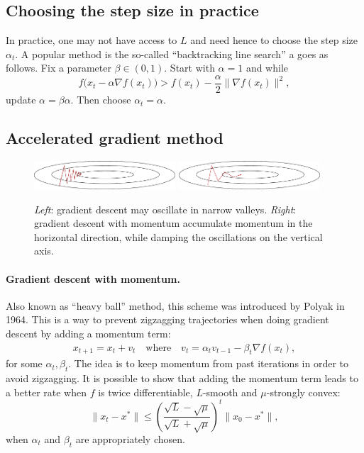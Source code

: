 \documentclass[11pt,nocut]{article}
\begin{document}
\subsection{Choosing the step size in practice}

In practice, one may not have access to $L$ and need hence to choose the step size $\alpha_t$. A popular method is the so-called ``backtracking line search'' a goes as follows.
Fix a parameter $\beta \in (0,1)$.
Start with $\alpha = 1$ and while
$$
f\big(x_t - \alpha \nabla f (x_t) \big) > f(x_t) - \frac{\alpha}{2} \|\nabla f(x_t) \|^2,
$$
update $\alpha =\beta \alpha$. Then choose $\alpha_t = \alpha$.

\subsection{Accelerated gradient method}

\begin{figure}[H]
	\begin{center}
		\includegraphics[width=0.47\textwidth]{figures/gd.pdf}
		\hspace{7mm}
		\includegraphics[width=0.47\textwidth]{figures/momentum.pdf}
		\caption{\emph{Left}: gradient descent may oscillate in narrow valleys. \emph{Right}: gradient descent with momentum accumulate momentum in the horizontal direction, while damping the oscillations on the vertical axis.}
	\end{center}
\end{figure}
\paragraph{Gradient descent with momentum.}

Also known as ``heavy ball'' method, this scheme was introduced by Polyak in 1964.
This is a way to prevent zigzagging trajectories when doing gradient descent by adding a momentum term:
\begin{align*}
	x_{t+1} = x_t + v_t
	\quad \text{where} \quad
	v_t = \alpha_t v_{t-1} - \beta_t \nabla f(x_{t}),
\end{align*}
for some $\alpha_t,\beta_t$. The idea is to keep momentum from past iterations in order to avoid zigzagging. It is possible to show that adding the momentum term leads to a better rate when $f$ is twice differentiable, $L$-smooth and $\mu$-strongly convex:
$$
\|x_t - x^*\| \leq \left(\frac{\sqrt{L}-\sqrt{\mu}}{\sqrt{L} + \sqrt{\mu}}\right)^{\! t} \|x_0 - x^*\|,
$$
when $\alpha_t$ and $\beta_t$ are appropriately chosen.
\end{document}
